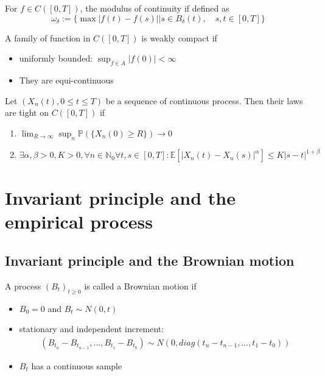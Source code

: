 \begin{definition}
	For $f \in C([0, T])$, the modulus of continuity if defined as 
	\begin{equation*}
		\omega_\delta := \{ \max |f(t) - f(s)| | s \in B_\delta(t),\quad s,t \in [0, T]\}
	\end{equation*}
\end{definition}

\begin{theorem} 
	A family of function in $C([0, T])$ is weakly compact if
	\begin{itemize}
		\item uniformly bounded: $\sup_{f \in A} |f(0)| < \infty$
		\item They are equi-continuous
	\end{itemize}
\end{theorem}

\begin{theorem}
Let $(X_n(t), 0 \leq t \leq T)$ be a sequence of continuous process. Then their laws are tight on $C([0, T])$ if
\begin{enumerate}
	\item $\lim_{R \rightarrow \infty} \sup_n \mathbb{P}(\{X_n(0) \geq R\}) \rightarrow 0$ 
	\item $\exists \alpha, \beta > 0, K > 0,  \forall n \in \mathbb{N}_0 \forall t, s \in [0, T]:\mathbb{E}[|X_n(t) - X_n(s)|^\alpha] \leq K|s-t|^{1+\beta}$
\end{enumerate}
\end{theorem}

\section{Invariant principle and the empirical process}
\subsection{Invariant principle and the Brownian motion}
\begin{definition}
	A process $(B_t)_{t \geq 0}$ is called a Brownian motion if
	\begin{itemize}
		\item $B_0 = 0$ and $B_t \sim N(0, t)$
		\item stationary and independent increment:
		\begin{align*}
			(B_{t_n} - B_{t_{n-1}}, \dots, B_{t_1} - B_{t_0}) \sim N(0, diag(t_n - t_{n-1}, \dots, t_1 - t_0))
		\end{align*}
		\item $B_t$ has a continuous sample
	\end{itemize}
\end{definition}

